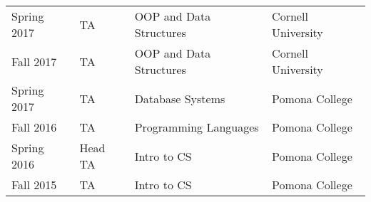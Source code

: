 \documentclass[]{deedy-resume-openfont}
\begin{document}
\begin{minipage}[t]{0.66\textwidth}
\begin{tabular}{llll}
  
    Spring 2017 & TA & OOP and Data Structures & Cornell University \\
  
    Fall 2017 & TA & OOP and Data Structures & Cornell University \\
  
    Spring 2017 & TA & Database Systems & Pomona College \\
  
    Fall 2016 & TA & Programming Languages & Pomona College \\
  
    Spring 2016 & Head TA & Intro to CS & Pomona College \\
  
    Fall 2015 & TA & Intro to CS & Pomona College \\
  
\end{tabular}


\sectionsep

\end{minipage} 
\end{document}
